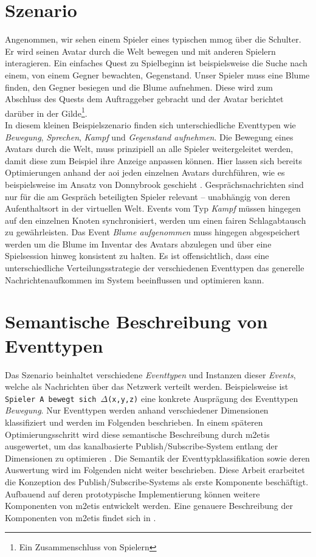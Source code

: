 \section{Szenario}
\label{chap:grundlagen:szenario}
Angenommen, wir sehen einem Spieler eines typischen \ac{mmog} über die Schulter. Er wird seinen Avatar durch die Welt bewegen und mit anderen Spielern interagieren. Ein einfaches Quest zu Spielbeginn ist beispielsweise die Suche nach einem, von einem Gegner bewachten, Gegenstand. Unser Spieler muss eine Blume finden, den Gegner besiegen und die Blume aufnehmen. Diese wird zum Abschluss des Quests dem Auftraggeber gebracht und der Avatar berichtet darüber in der Gilde\footnote{Ein Zusammenschluss von Spielern}.\\
In diesem kleinen Beispielszenario finden sich unterschiedliche Eventtypen wie \emph{Bewegung}, \emph{Sprechen}, \emph{Kampf} und \emph{Gegenstand aufnehmen}. Die Bewegung eines Avatars durch die Welt, muss prinzipiell an alle Spieler weitergeleitet werden, damit diese zum Beispiel ihre Anzeige anpassen können. Hier lassen sich bereits Optimierungen anhand der \ac{aoi} jeden einzelnen Avatars durchführen, wie es beispielsweise im Ansatz von Donnybrook geschieht \cite{Bharambe2008Donnybrook}. Gesprächsnachrichten sind nur für die am Gespräch beteiligten Spieler relevant -- unabhängig von deren Aufenthaltsort in der virtuellen Welt. Events vom Typ \emph{Kampf} müssen hingegen auf den einzelnen Knoten synchronisiert, werden um einen fairen Schlagabtausch zu gewährleisten. Das Event \emph{Blume aufgenommen} muss hingegen abgespeichert werden um die Blume im Inventar des Avatars abzulegen und über eine Spielsession hinweg konsistent zu halten. Es ist offensichtlich, dass eine unterschiedliche Verteilungsstrategie der verschiedenen Eventtypen das generelle Nachrichtenaufkommen im System beeinflussen und optimieren kann.

\section{Semantische Beschreibung von Eventtypen}
\label{chap:grundlagen:event}
Das Szenario beinhaltet verschiedene \emph{Eventtypen} und Instanzen dieser \emph{Events}, welche als Nachrichten über das Netzwerk verteilt werden. Beispielsweise ist \texttt{Spieler A bewegt sich $\Delta$(x,y,z)} eine konkrete Ausprägung des Eventtypen \emph{Bewegung}. Nur Eventtypen werden anhand verschiedener Dimensionen klassifiziert und werden im Folgenden beschrieben. In einem späteren Optimierungsschritt wird diese semantische Beschreibung durch \ac{m2etis} ausgewertet, um das kanalbasierte Publish/Subscribe-System entlang der Dimensionen zu optimieren \cite{Fischer2010a}. Die Semantik der Eventtypklassifikation sowie deren Auswertung wird im Folgenden nicht weiter beschrieben. Diese Arbeit erarbeitet die Konzeption des Publish/Subscribe-Systems als erste Komponente beschäftigt. Aufbauend auf deren prototypische Implementierung können weitere Komponenten von \ac{m2etis} entwickelt werden. Eine genauere Beschreibung der Komponenten von \ac{m2etis} findet sich in .

